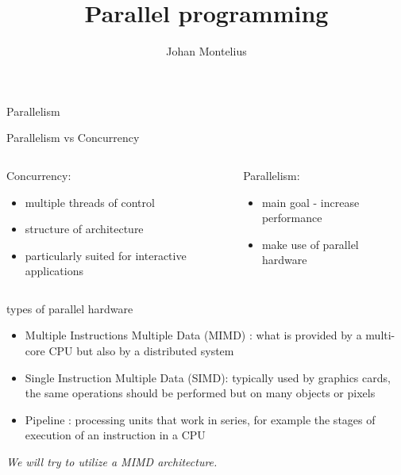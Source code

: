 

\title[ID1019 Parallel programming]{Parallel programming}
 

\author{Johan Montelius}
\date{\semester}



\begin{frame}
\titlepage
\end{frame}

\begin{frame}{Parallelism}

Parallelism vs Concurrency 

\vspace{20pt}

\begin{columns}
 \begin{column}{0.5\linewidth}
  Concurrency:
  \begin{itemize}
    \item multiple threads of control
    \item structure of architecture
    \item particularly suited for interactive applications
  \end{itemize}
 \end{column}
 \pause
 \begin{column}{0.5\linewidth}
  Parallelism:
   \begin{itemize}
    \item main goal - increase performance
    \item make use of parallel hardware
  \end{itemize}
 \end{column}
\end{columns}

\pause\vspace{10pt}{\em A concurrent program could be parallelized.}

\end{frame}

\begin{frame}{types of parallel hardware}

\begin{itemize}
  \pause\item Multiple Instructions Multiple Data (MIMD) : what is
  provided by a multi-core CPU but also by a distributed system

\pause\item Single Instruction Multiple Data (SIMD): typically used by
graphics cards, the same operations should be performed but on many
objects or pixels

\pause\item Pipeline : processing units that work in series, for
example the stages of execution of an instruction in a CPU

\end{itemize}

\pause\vspace{20pt}

{\em We will try to utilize a MIMD architecture.}

\end{frame}

